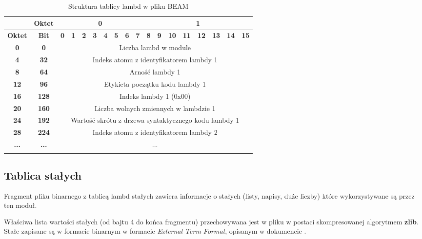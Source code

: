 \begin{longtable}{|c|c|c|c|c|c|c|c|c|c|c|c|c|c|c|c|c|c|}
\hline
         & \textbf{Oktet} & \multicolumn{8}{|c|}{\textbf{0}} & \multicolumn{8}{|c|}{\textbf{1}} \\
\hline
\textbf{Oktet} & \textbf{Bit} & \textbf{0} & \textbf{1} & \textbf{2} & \textbf{3} & \textbf{4} & \textbf{5} & \textbf{6} & \textbf{7} & \textbf{8} & \textbf{9} & \textbf{10} & \textbf{11} & \textbf{12} & \textbf{13} & \textbf{14} & \textbf{15}\\
\hline
\textbf{0} & \textbf{0} & \multicolumn{16}{|c|}{Liczba lambd w module} \\[3ex]
\hline
\textbf{4} & \textbf{32} & \multicolumn{16}{|c|}{Indeks atomu z identyfikatorem lambdy 1}\\[3ex]
\hline
\textbf{8} & \textbf{64} & \multicolumn{16}{|c|}{Arność lambdy 1} \\[3ex]
\hline
\textbf{12} & \textbf{96} & \multicolumn{16}{|c|}{Etykieta początku kodu lambdy 1}\\[3ex]
\hline
\textbf{16} & \textbf{128} & \multicolumn{16}{|c|}{Indeks lambdy 1 (0x00)}\\[3ex]
\hline
\textbf{20} & \textbf{160} & \multicolumn{16}{|c|}{Liczba wolnych zmiennych w lambdzie 1}\\[3ex]
\hline
\textbf{24} & \textbf{192} & \multicolumn{16}{|c|}{Wartość skrótu z drzewa syntaktycznego kodu lambdy 1}\\[3ex]
\hline
\textbf{28} & \textbf{224} & \multicolumn{16}{|c|}{Indeks atomu z identyfikatorem lambdy 2}\\[3ex]
\hline
\textbf{...} & \textbf{...} & \multicolumn{16}{|c|}{...}  \\[3ex]
\hline
\caption{Struktura tablicy lambd w pliku BEAM}
\label{table:lambdatable} \\
\end{longtable}

\subsection{Tablica stałych}
Fragment pliku binarnego z tablicą lambd stałych zawiera informacje o stałych (listy, napisy, duże liczby) które wykorzystywane są przez ten moduł.

Właściwa lista wartości stałych (od bajtu 4 do końca fragmentu) przechowywana jest w pliku w postaci skompresowanej algorytmem \textbf{zlib}.
Stałe zapisane są w formacie binarnym w formacie \emph{External Term Format}, opisanym w dokumencie \cite{ExternalTermFormat}.

